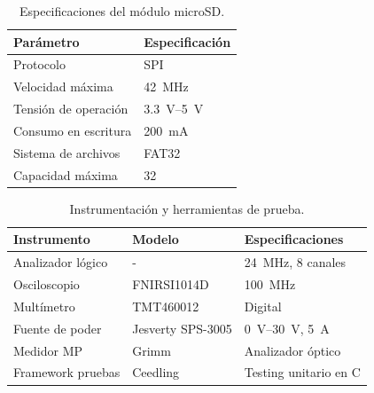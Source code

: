 \begin{table}[h!]
	\centering
	\caption{Especificaciones del módulo microSD. %
	}
	\small
	\begin{tabular}{ll}
		\toprule
		\textbf{Parámetro} & \textbf{Especificación} \\
		\midrule
		Protocolo & SPI \\
		Velocidad máxima & \SI{42}{\mega\hertz} \\
		Tensión de operación & \SIrange{3.3}{5}{\volt} \\
		Consumo en escritura & \SI{200}{\milli\ampere} \\
		Sistema de archivos & FAT32 \\
		Capacidad máxima & \SI{32}{\giga\byte} \\
		\bottomrule
	\end{tabular}
	\label{tab:microsd_specs}
\end{table}


\begin{table}[htbp]
	\centering
	\small
	\caption{Características principales del módulo ESP8266. %
	}
	\label{table:esp8266_specs}
	
\end{table}



\begin{table}[htbp]
	\caption{Instrumentación y herramientas de prueba.}
	\label{tab:pruebas}
	\small
	\centering
	\begin{tabular}{lll}
		\hline
		\textbf{Instrumento} & \textbf{Modelo} & \textbf{Especificaciones} \\
		\hline
		Analizador lógico & - & \SI{24}{\mega\hertz}, 8 canales \\
		Osciloscopio & FNIRSI1014D & \SI{100}{\mega\hertz} \\
		Multímetro & TMT460012 & Digital \\
		Fuente de poder & Jesverty SPS-3005 & \SIrange{0}{30}{\volt}, \SI{5}{\ampere} \\
		Medidor MP & Grimm & Analizador óptico \\
		Framework pruebas & Ceedling & Testing unitario en C \\
		\hline
	\end{tabular}
\end{table}


